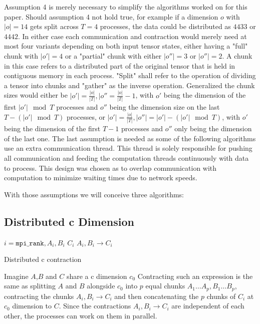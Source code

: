 Assumption 4 is merely necessary to simplify the algorithms worked on for this paper.
Should assumption 4 not hold true, for example if a dimension $o$ with $|o|=14$ gets split across $T=4$ processes, the data could be distributed as $4 4 3 3$ or $4 4 4 2$.
In either case each communication and contraction would merely need at most four variants depending on both input tensor states, either having a "full" chunk with $|o'|=4$ or a "partial" chunk with either $|o''|=3$ or $|o''|=2$.
A chunk in this case refers to a distributed part of the original tensor that is held in contiguous memory in each process.
"Split" shall refer to the operation of dividing a tensor into chunks and "gather" as the inverse operation.
Generalized the chunk sizes would either be $|o'| = \frac{|o|}{|T|}, |o'' = \frac{|o|}{|T|} - 1$, with $o'$ being the dimension of the first $|o'| \mod T$ processes and $o''$ being the dimension size on the last $T - (|o'| \mod T)$ processes, or $|o'| = \frac{|o|}{|T|}, |o''| = |o'| - (|o'| \mod T)$, with $o'$ being the dimension of the first $T-1$ processes and $o''$ only being the dimension of the last one.
The last assumption is needed as some of the following algorithms use an extra communication thread.
This thread is solely responsible for pushing all communication and feeding the computation threads continuously with data to process.
This design was chosen as to overlap communication with computation to minimize waiting times due to network speeds.

With those assumptions we will conceive three algorithms:

\subsection{Distributed c Dimension}

\begin{algorithm}[ht]
    \begin{algorithmic}
    \Require $i = \texttt{mpi\_rank}, A_i, B_i$
    \Ensure $C_i$
    \State $A_i, B_i \rightarrow C_i$
\end{algorithmic}
\caption{Distributed c contraction}
\label{alg:c_pseudocode}
\end{algorithm}

Imagine $A$,$B$ and $C$ share a c dimension $c_0$
Contracting such an expression is the same as splitting $A$ and $B$ alongside $c_0$ into $p$ equal chunks $A_1\dots A_{p}, B_1\dots B_{p}$, contracting the chunks $A_i, B_i \rightarrow C_i$ and then concatenating the $p$ chunks of $C_i$ at $c_0$ dimension to $C$.
Since the contractions $A_i, B_i \rightarrow C_i$ are independent of each other, the processes can work on them in parallel.

